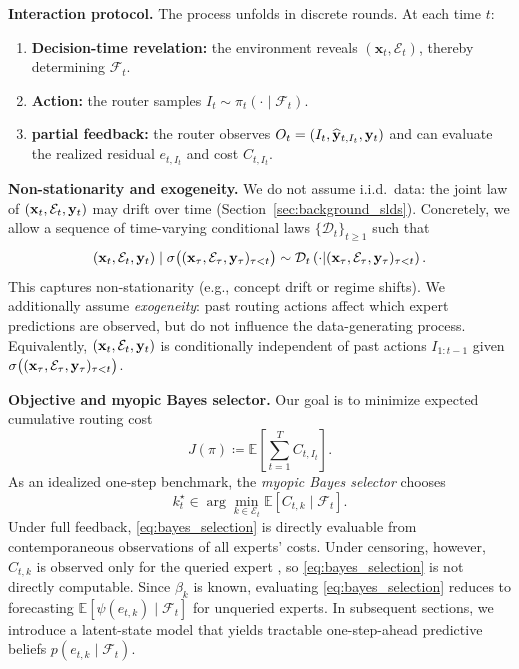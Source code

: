\textbf{Interaction protocol.}
The process unfolds in discrete rounds. At each time \(t\):
\begin{enumerate}[topsep=0pt,itemsep=1pt,parsep=0pt]
    \item \textbf{Decision-time revelation:} the environment reveals \((\mathbf{x}_t,\mathcal{E}_t)\),
    thereby determining \(\mathcal{F}_t\).
    \item \textbf{Action:} the router samples \(I_t \sim \pi_t(\cdot \mid \mathcal{F}_t)\).
    \item \textbf{partial feedback:} the router observes \(O_t=(I_t,\widehat{\mathbf{y}}_{t,I_t},\mathbf{y}_t)\) and can
    evaluate the realized residual \(e_{t,I_t}\) and cost \(C_{t,I_t}\).
\end{enumerate}


\textbf{Non-stationarity and exogeneity.}
We do not assume i.i.d.\ data: the joint law of \((\mathbf{x}_t,\mathcal{E}_t,\mathbf{y}_t)\) may drift over
time (Section~\ref{sec:background_slds}). Concretely, we allow a sequence of time-varying conditional
laws \(\{\mathcal{D}_t\}_{t\ge 1}\) such that
	\begin{equation*}
	    (\mathbf{x}_t,\mathcal{E}_t,\mathbf{y}_t)\mid \sigma\big((\mathbf{x}_\tau,\mathcal{E}_\tau,\mathbf{y}_\tau)_{\tau<t}\big)
	    \sim \mathcal{D}_t\left(\cdot \middle| (\mathbf{x}_\tau,\mathcal{E}_\tau,\mathbf{y}_\tau)_{\tau<t}\right).
	\end{equation*}
This captures non-stationarity (e.g., concept drift or regime shifts). We additionally assume
\emph{exogeneity}: past routing actions affect which expert predictions
are observed, but do not influence the data-generating process. Equivalently,
\((\mathbf{x}_t,\mathcal{E}_t,\mathbf{y}_t)\) is conditionally independent of past actions \(I_{1:t-1}\)
given \(\sigma\big((\mathbf{x}_\tau,\mathcal{E}_\tau,\mathbf{y}_\tau)_{\tau<t}\big)\).

\textbf{Objective and myopic Bayes selector.}
Our goal is to minimize expected cumulative routing cost
\begin{equation}
\label{eq:routing_objective}
    J(\pi) \coloneqq \mathbb{E}\left[\sum_{t=1}^T C_{t,I_t}\right].
\end{equation}
As an idealized one-step benchmark, the \emph{myopic Bayes selector} chooses
\begin{equation}
\label{eq:bayes_selection}
    k_t^{\star} \in \arg\min_{k\in\mathcal{E}_t} \mathbb{E}\left[C_{t,k} \mid \mathcal{F}_t\right].
\end{equation}
Under full feedback, \eqref{eq:bayes_selection} is directly evaluable from contemporaneous observations
of all experts' costs. Under censoring, however, \(C_{t,k}\) is observed only for the queried expert
\citep{neu2010online}, so \eqref{eq:bayes_selection} is not directly computable.
Since \(\beta_k\) is known, evaluating \eqref{eq:bayes_selection} reduces to forecasting
\(\mathbb{E}[\psi(e_{t,k})\mid \mathcal{F}_t]\) for unqueried experts. In subsequent sections, we introduce a latent-state model that yields tractable
one-step-ahead predictive beliefs \(p(e_{t,k}\mid \mathcal{F}_t)\).

